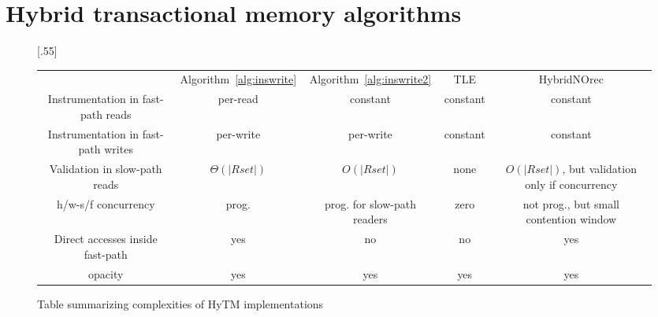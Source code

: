 \section{Hybrid transactional memory algorithms}\label{sec:hytmalgos}
%
\begin{figure*}[!t]
      
     \scalebox{.55}[.55]{
     \begin{tabularx}{\textwidth}{c|c|c|c|c}
	~~~~~ & Algorithm~\ref{alg:inswrite} & Algorithm~\ref{alg:inswrite2} & TLE & HybridNOrec\\ 
	Instrumentation in fast-path reads & per-read & constant & constant & constant \\ 
	Instrumentation in fast-path writes & per-write & per-write & constant & constant \\ 
	Validation in slow-path reads & $\Theta(|Rset|)$ & $O(|Rset|)$ & none & $O(|Rset|)$, but validation only if concurrency \\ 
	h/w-s/f concurrency & prog. & prog. for slow-path readers & zero & not prog., but small contention window \\ 
	Direct accesses inside fast-path & yes & no & no & yes \\ 
	opacity & yes & yes & yes & yes 
   \end{tabularx}
\caption{Table summarizing complexities of HyTM implementations}\label{fig:main}    
}
\end{figure*}
%

%
